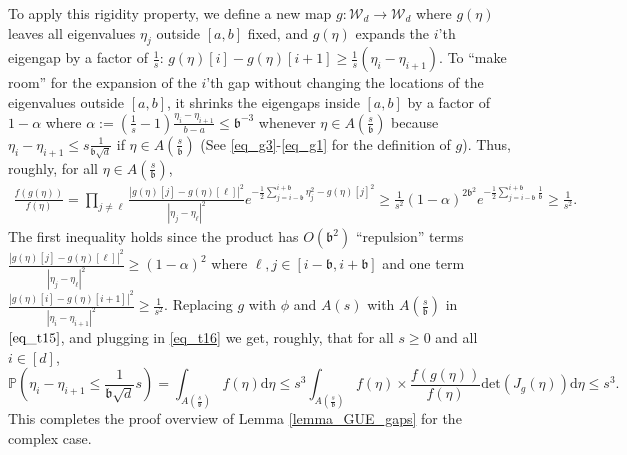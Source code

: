 \documentclass[11pt,letterpaper]{article}
\begin{document}
To apply this rigidity property, we define a new map  $g : \mathcal{W}_d \rightarrow \mathcal{W}_d$ where $g(\eta)$ leaves all eigenvalues $\eta_j$ outside $[a,b]$ fixed, 
%
%
 and $g(\eta)$ expands the $i$'th eigengap by a factor of $\frac{1}{s}$:   $g(\eta)[i] - g(\eta)[i+1] \geq \frac{1}{s}(\eta_i - \eta_{i+1})$. 
%
To ``make room'' for the expansion of the $i$'th gap without changing the locations of the eigenvalues outside $[a,b]$, it shrinks the eigengaps inside $[a,b]$ by a factor of $1-\alpha$ where $\alpha := (\frac{1}{s}-1)\frac{\eta_i - \eta_{i+1}}{b-a} \leq \mathfrak{b}^{-3}$ whenever $\eta \in A(\frac{s}{ \mathfrak{b}})$ because $\eta_i - \eta_{i+1} \leq s\frac{1}{ \mathfrak{b} \sqrt{d}}$  if $\eta \in A(\frac{s}{ \mathfrak{b}})$
(See \eqref{eq_g3}-\eqref{eq_g1} for the definition of $g$).
%
%
Thus, roughly, for all $\eta \in A(\frac{s}{\mathfrak{b}})$, 
%
\begin{eqnarray}\label{eq_t16}
%
 \frac{f(g(\eta))}{f(\eta)} \!= \!\prod_{j \neq \ell} \frac{|g(\eta)[j] - g(\eta)[\ell]|^2}{|\eta_j - \eta_{\ell}|^2}  e^{-\frac{1}{2} \sum_{j= i - \mathfrak{b}}^{i +\mathfrak{b}} \eta_j^2- g(\eta)[j]^2} 
    \geq \frac{1}{s^2}  (1-\alpha)^{2\mathfrak{b}^2}  e^{-\frac{1}{2} \sum_{j= i - \mathfrak{b}}^{i +\mathfrak{b}} \frac{1}{\mathfrak{b}}} 
    \geq \frac{1}{s^2}.
%   
\end{eqnarray}
%
The first inequality holds since the product has $O(\mathfrak{b}^2)$ ``repulsion'' terms $\frac{|g(\eta)[j] - g(\eta)[\ell]|^2}{|\eta_j - \eta_{\ell}|^2} \geq (1-\alpha)^2$  where  $\ell, j \in [i-\mathfrak{b}, i+\mathfrak{b}]$ and one term $\frac{|g(\eta)[i] - g(\eta)[i+1]|^2}{|\eta_i - \eta_{i+1}|^2} \geq \frac{1}{s^2}$.
%
%
Replacing $g$ with $\phi$ and $A(s)$ with $A(\frac{s}{\mathfrak{b}})$ in $\eqref{eq_t15}$, and plugging in \eqref{eq_t16}  
we get, roughly, that for all $s \geq 0$ and all $i \in [d]$,
%
\begin{equation}
     \mathbb{P}\left(\eta_i - \eta_{i+1} \leq \frac{1}{\mathfrak{b} \sqrt{d}} s \right) = \int_{A(\frac{s}{\mathfrak{b}})} f(\eta) \mathrm{d} \eta  \leq s^3 \int_{A(\frac{s}{\mathfrak{b}})}  f(\eta) \times  \frac{f(g(\eta))}{f(\eta)}  \mathrm{det}(J_g(\eta))  \mathrm{d} \eta \leq s^3.
%
\end{equation}
%
This completes the proof overview of Lemma \ref{lemma_GUE_gaps} for the complex case.
\end{document}
